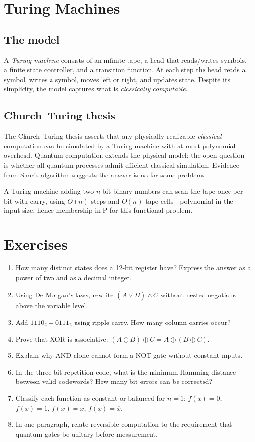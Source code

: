 \section{Turing Machines}
\label{sec:turing}

\subsection{The model}

A \emph{Turing machine} consists of an infinite tape, a head that reads/writes symbols, a finite state controller, and a transition function. At each step the head reads a symbol, writes a symbol, moves left or right, and updates state. Despite its simplicity, the model captures what is \emph{classically computable}.

\subsection{Church--Turing thesis}

The Church--Turing thesis asserts that any physically realizable \emph{classical} computation can be simulated by a Turing machine with at most polynomial overhead. Quantum computation extends the physical model: the open question is whether all quantum processes admit efficient classical simulation. Evidence from Shor's algorithm suggests the answer is no for some problems.

\begin{example}
A Turing machine adding two $n$-bit binary numbers can scan the tape once per bit with carry, using $O(n)$ steps and $O(n)$ tape cells---polynomial in the input size, hence membership in P for this functional problem.
\end{example}

\section*{Exercises}
\begin{enumerate}[label=\arabic*.]
\item How many distinct states does a 12-bit register have? Express the answer as a power of two and as a decimal integer.
\item Using De Morgan's laws, rewrite $\overline{(\overline{A}\lor B)\land C}$ without nested negations above the variable level.
\item Add $1110_2 + 0111_2$ using ripple carry. How many column carries occur?
\item Prove that XOR is associative: $(A\oplus B)\oplus C = A\oplus(B\oplus C)$.
\item Explain why AND alone cannot form a NOT gate without constant inputs.
\item In the three-bit repetition code, what is the minimum Hamming distance between valid codewords? How many bit errors can be corrected?
\item Classify each function as constant or balanced for $n=1$: $f(x)=0$, $f(x)=1$, $f(x)=x$, $f(x)=\overline{x}$.
\item In one paragraph, relate reversible computation to the requirement that quantum gates be unitary before measurement.
\end{enumerate}
